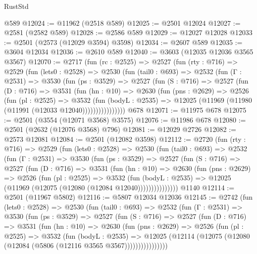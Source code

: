\begin{lexlean}{RustStd}
\begin{coremodule}
    @589
@12024 := @11962 (@2518 @589)
@12025 := @2501 @12024
@12027 := @2581 (@2582 @589)
@12028 := @2586 @589
@12029 := @12027 @12028
@12033 := @2501 (@2573 (@12029 @3594) @3598)
@12034 := @2607 @589
@12035 := @3604 @12034
@12036 := @2610 @589
@12040 := @3603 (@12035 @12036 @3565 @3567)
@12070 := @2717
    (fun (rc : @2525) =>
    @2527
      (fun (rty : @716) =>
      @2529
        (fun (lets0 : @2528) =>
        @2530
          (fun (tail0 : @693) =>
          @2532
            (fun (Γ : @2531) =>
            @3530
              (fun (ps : @3529) =>
              @2527
                (fun (S : @716) =>
                @2527
                  (fun (D : @716) =>
                  @3531
                    (fun (hn : @10) =>
                    @2630
                      (fun (pns : @2629) =>
                      @2526
                        (fun (pl : @2525) =>
                        @3532
                          (fun (bodyL : @2535) =>
                          @12025 (@11969 (@11980 (@11991 (@12033 @12040))))))))))))))))
    @678
@12071 := @11975 @678
@12075 := @2501 (@3554 (@12071 @3568) @3575)
@12076 := @11986 @678
@12080 := @2501 (@2632 (@12076 @3568) @796)
@12081 := @12029 @2726
@12082 := @2573 @12081
@12084 := @2501 (@12082 @3598)
@12112 := @2720
    (fun (rty : @716) =>
    @2529
      (fun (lets0 : @2528) =>
      @2530
        (fun (tail0 : @693) =>
        @2532
          (fun (Γ : @2531) =>
          @3530
            (fun (ps : @3529) =>
            @2527
              (fun (S : @716) =>
              @2527
                (fun (D : @716) =>
                @3531
                  (fun (hn : @10) =>
                  @2630
                    (fun (pns : @2629) =>
                    @2526
                      (fun (pl : @2525) =>
                      @3532
                        (fun (bodyL : @2535) =>
                        @12025 (@11969 (@12075 (@12080 (@12084 @12040)))))))))))))))
    @1140
@12114 := @2501 (@11967 @5802)
@12116 := @5807 @12034 @12036
@12145 := @2742
    (fun (lets0 : @2528) =>
    @2530
      (fun (tail0 : @693) =>
      @2532
        (fun (Γ : @2531) =>
        @3530
          (fun (ps : @3529) =>
          @2527
            (fun (S : @716) =>
            @2527
              (fun (D : @716) =>
              @3531
                (fun (hn : @10) =>
                @2630
                  (fun (pns : @2629) =>
                  @2526
                    (fun (pl : @2525) =>
                    @3532
                      (fun (bodyL : @2535) =>
                      @12025
                        (@12114 (@12075 (@12080 (@12084 (@5806 (@12116 @3565 @3567))))))))))))))))

\end{coremodule}
\end{lexlean}
